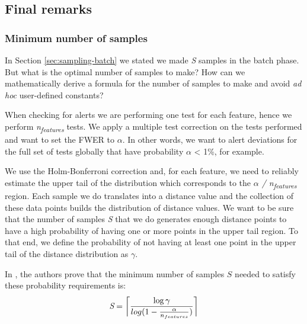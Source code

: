 \subsection{Final remarks}

\subsubsection*{Minimum number of samples} \label{sec:nsamples}
In Section \ref{sec:sampling-batch} we stated we made \textit{S} samples in the batch phase. But what is the optimal number of samples to make? How can we mathematically derive a formula for the number of samples to make and avoid \textit{ad hoc} user-defined constants?

When checking for alerts we are performing one test for each feature, hence we perform \textit{n\textsubscript{features}} tests. We apply a multiple test correction on the tests performed and want to set the FWER to $\alpha$. In other words, we want to alert deviations for the full set of tests globally that have probability $\alpha$ < 1\%, for example.

We use the Holm-Bonferroni correction and, for each feature, we need to reliably estimate the upper tail of the distribution which corresponds to the \textit{$\alpha$ / n\textsubscript{features}} region. Each sample we do translates into a distance value and the collection of these data points builds the distribution of distance values. We want to be sure that the number of samples \textit{S} that we do generates enough distance points to have a high probability of having one or more points in the upper tail region. To that end, we define the probability of not having at least one point in the upper tail of the distance distribution as $\gamma$. 

In \cite{SAMM}, the authors prove that the minimum number of samples $S$ needed to satisfy these probability requirements is:
\begin{equation}
    \label{eq:optimal-n-samples}
    \textit{S} = \ceil[\bigg]{\frac{\log\gamma}{log(1 - \frac{\alpha}{n_{features}})}}
\end{equation}
